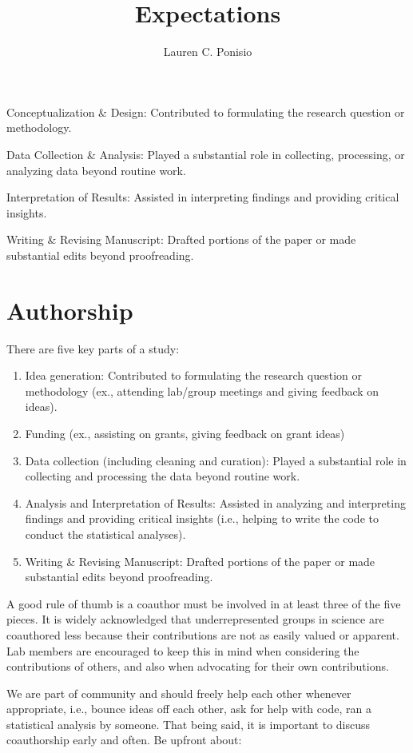\documentclass[12pt]{article}
\title{Expectations}
\author{Lauren C. Ponisio}
\begin{document}
\maketitle

Conceptualization \& Design: Contributed to formulating the research question or methodology.

Data Collection \& Analysis: Played a substantial role in collecting, processing, or analyzing data beyond routine work.

Interpretation of Results: Assisted in interpreting findings and providing critical insights.

Writing \& Revising Manuscript: Drafted portions of the paper or made substantial edits beyond proofreading.

\section{Authorship}
There are five key parts of a study:
\begin{enumerate}
\item Idea generation: Contributed to formulating the research
  question or methodology (ex., attending lab/group meetings and
  giving feedback on ideas).
\item Funding (ex., assisting on grants, giving feedback on grant ideas)
\item Data collection (including cleaning and curation): Played a
  substantial role in collecting and processing the data beyond
  routine work.
\item Analysis and Interpretation of Results: Assisted in analyzing
  and interpreting findings and providing critical insights (i.e.,
  helping to write the code to conduct the statistical analyses). 
\item Writing \& Revising Manuscript: Drafted portions of the paper or
  made substantial edits beyond proofreading.
\end{enumerate}

A good rule of thumb is a coauthor must be involved in at least three
of the five pieces. It is widely acknowledged that underrepresented
groups in science are coauthored less because their contributions are
not as easily valued or apparent. Lab members are encouraged to keep
this in mind when considering the contributions of others, and also
when advocating for their own contributions. 

We are part of community and should freely help each other whenever
appropriate, i.e., bounce ideas off each other, ask for help with
code, ran a statistical analysis by someone. That being said, it is
important to discuss coauthorship early and often. Be upfront about:
\end{document}
